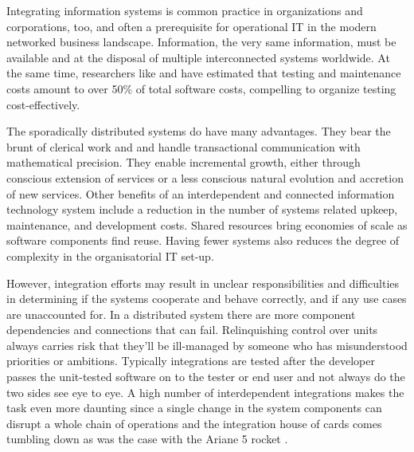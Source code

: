 \documentclass[12pt,a4paper,oneside,pdftex]{report}
\begin{document}
Integrating information systems is common practice in organizations and corporations, too, and often a prerequisite for operational IT in the modern networked business landscape. Information, the very same information, must be available and at the disposal of multiple interconnected systems worldwide. At the same time, researchers like \citet{myers1976software} and \citet{reid2005art} have estimated that testing and maintenance costs amount to over 50\% of total software costs, compelling to organize testing cost-effectively.

The sporadically distributed systems do have many advantages. They bear the brunt of clerical work and and handle transactional communication with mathematical precision. They enable incremental growth, either through conscious extension of services or a less conscious natural evolution and accretion of new services. Other benefits of an interdependent and connected information technology system include a reduction in the number of systems related upkeep, maintenance, and development costs. Shared resources bring economies of scale as software components find reuse. \citep{rehman2007testing} Having fewer systems also reduces the degree of complexity in the organisatorial IT set-up.

\begin{comment}
Automation is one of the great boons brought on by technological development on one hand freeing up resources like labour for more value-adding purposes --- and permitting the execution of uniform, repeatable processes and process control on the other. The pinnacle of advancement and prosperity on which society stands today is based on a continuous flow of various automated tasks and electronic services, many of which are complex and involve a slew of actors or agents. Work is divided and its completion therefore requires cooperation between service systems.
\end{comment}

However, integration efforts may result in unclear responsibilities and difficulties in determining if the systems cooperate and behave correctly, and if any use cases are unaccounted for. In a distributed system there are more component dependencies and connections that can fail. Relinquishing control over units always carries risk that they'll be ill-managed by someone who has misunderstood priorities or ambitions. Typically integrations are tested after the developer passes the unit-tested software on to the tester or end user and not always do the two sides see eye to eye. A high number of interdependent integrations makes the task even more daunting since a single change in the system components can disrupt a whole chain of operations and the integration house of cards comes tumbling down as was the case with the Ariane 5 rocket \citep{pezze2008software, rehman2007testing}.
\end{document}

